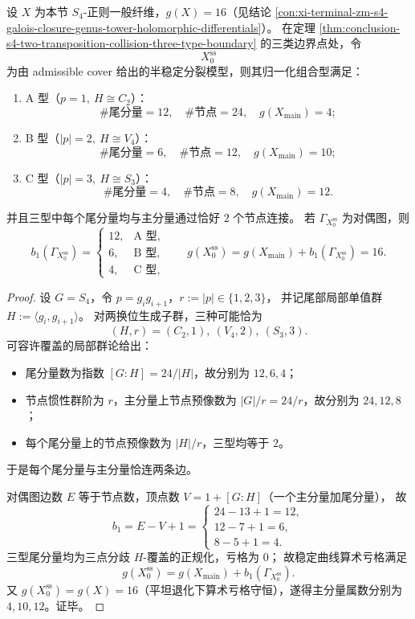 

\begin{theorem}\label{thm:conclusion-s4-cusp-stable-limit-normalization-node-genus}
设 \(X\) 为本节 \(S_4\)-正则一般纤维，\(g(X)=16\)（见结论 \ref{con:xi-terminal-zm-s4-galois-closure-genus-tower-holomorphic-differentials}）。
在定理 \ref{thm:conclusion-s4-two-transposition-collision-three-type-boundary} 的三类边界点处，令
\[
X_0^{\mathrm{ss}}
\]
为由 admissible cover 给出的半稳定分裂模型，则其归一化组合型满足：
\begin{enumerate}
  \item A 型（\(p=1,\ H\cong C_2\)）：
  \[
  \#\text{尾分量}=12,\quad
  \#\text{节点}=24,\quad
  g(X_{\mathrm{main}})=4;
  \]
  \item B 型（\(|p|=2,\ H\cong V_4\)）：
  \[
  \#\text{尾分量}=6,\quad
  \#\text{节点}=12,\quad
  g(X_{\mathrm{main}})=10;
  \]
  \item C 型（\(|p|=3,\ H\cong S_3\)）：
  \[
  \#\text{尾分量}=4,\quad
  \#\text{节点}=8,\quad
  g(X_{\mathrm{main}})=12.
  \]
\end{enumerate}
并且三型中每个尾分量均与主分量通过恰好 \(2\) 个节点连接。
若 \(\Gamma_{X_0^{\mathrm{ss}}}\) 为对偶图，则
\[
b_1(\Gamma_{X_0^{\mathrm{ss}}})=
\begin{cases}
12,&\text{A 型},\\
6,&\text{B 型},\\
4,&\text{C 型},
\end{cases}
\qquad
g(X_0^{\mathrm{ss}})=g(X_{\mathrm{main}})+b_1(\Gamma_{X_0^{\mathrm{ss}}})=16.
\]
\end{theorem}
\begin{proof}
设 \(G=S_4\)，令 \(p=g_ig_{i+1}\)，\(r:=|p|\in\{1,2,3\}\)，
并记尾部局部单值群 \(H:=\langle g_i,g_{i+1}\rangle\)。
对两换位生成子群，三种可能恰为
\[
(H,r)=(C_2,1),\ (V_4,2),\ (S_3,3).
\]
可容许覆盖的局部群论给出：
\begin{itemize}
  \item 尾分量数为指数 \([G:H]=24/|H|\)，故分别为 \(12,6,4\)；
  \item 节点惯性群阶为 \(r\)，主分量上节点预像数为 \(|G|/r=24/r\)，故分别为 \(24,12,8\)；
  \item 每个尾分量上的节点预像数为 \(|H|/r\)，三型均等于 \(2\)。
\end{itemize}
于是每个尾分量与主分量恰连两条边。

对偶图边数 \(E\) 等于节点数，顶点数 \(V=1+[G:H]\)（一个主分量加尾分量），
故
\[
b_1=E-V+1=
\begin{cases}
24-13+1=12,\\
12-7+1=6,\\
8-5+1=4.
\end{cases}
\]
三型尾分量均为三点分歧 \(H\)-覆盖的正规化，亏格为 \(0\)；
故稳定曲线算术亏格满足
\[
g(X_0^{\mathrm{ss}})=g(X_{\mathrm{main}})+b_1(\Gamma_{X_0^{\mathrm{ss}}}).
\]
又 \(g(X_0^{\mathrm{ss}})=g(X)=16\)（平坦退化下算术亏格守恒），遂得主分量属数分别为 \(4,10,12\)。证毕。
\end{proof}

